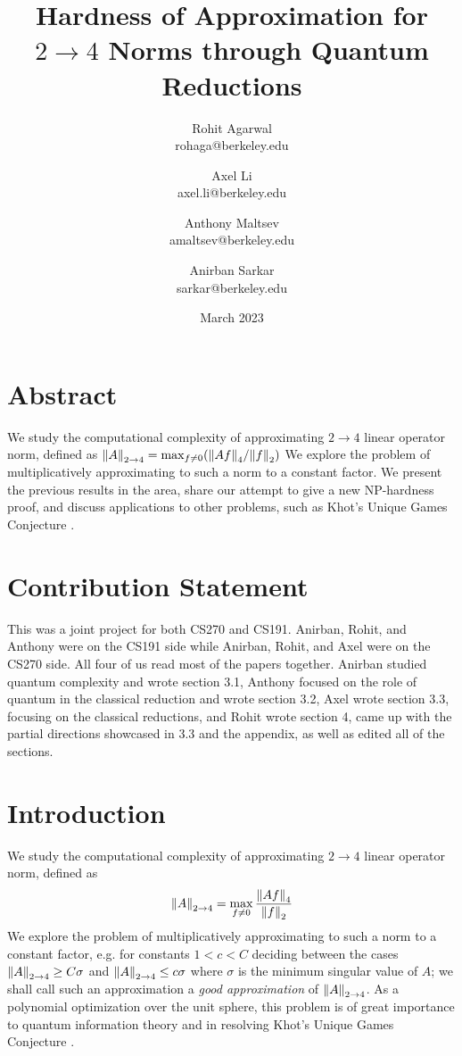 \documentclass[10pt]{article}
\title{Hardness of Approximation for $2 \to 4$ Norms through Quantum Reductions}
\author{ Rohit Agarwal \\
rohaga@berkeley.edu
\and Axel Li\\
axel.li@berkeley.edu\\ \and Anthony Maltsev\\
amaltsev@berkeley.edu\\ \and Anirban Sarkar \\
sarkar@berkeley.edu }
\date{March 2023}
\newcommand{\ATF}{\norm{A}_{2 \to 4}}
\begin{document}
\maketitle
\section*{Abstract}
We study the computational complexity of approximating $2\to4$ linear operator norm, defined as $\norm{A}_{2 \to 4} = \max_{f \neq 0} (\norm{Af}_4/ \norm{f}_2)$
We explore the problem of multiplicatively approximating to such a norm to a constant factor. We present the previous results in the area, share our attempt to give a new NP-hardness proof, and discuss applications to other problems, such as Khot's Unique Games Conjecture \cite{ugc}.

\section*{Contribution Statement}
This was a joint project for both CS270 and CS191. Anirban, Rohit, and Anthony were on the CS191 side while Anirban, Rohit, and Axel were on the CS270 side.
All four of us read most of the papers together. Anirban studied quantum complexity and wrote section 3.1, Anthony focused on the role of quantum in the classical reduction and wrote section 3.2, Axel wrote section 3.3, focusing on the classical reductions, and Rohit wrote section 4, came up with the partial directions showcased in 3.3 and the appendix, as well as edited all of the sections.
\newpage
\section{Introduction}
We study the computational complexity of approximating $2\to4$ linear operator norm, defined as
\[ \norm{A}_{2 \to 4} = \max_{f \neq 0} \frac{\norm{Af}_4}{\norm{f}_2} \]
We explore the problem of multiplicatively approximating to such a norm to a constant factor, e.g. for constants $1 < c < C$ deciding between the cases $\ATF \geq C \sigma$ and $\ATF \leq c \sigma$ where $\sigma$ is the minimum singular value of $A$; we shall call such an approximation a \textit{good approximation} of $\ATF$. 
As a polynomial optimization over the unit sphere, this problem is of great importance to 
quantum information theory and in resolving Khot's Unique Games Conjecture \cite{ugc}.
\end{document}
